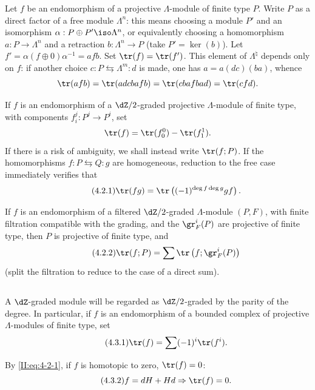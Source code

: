 Let $f$ be an endomorphism of a projective $\Lambda$-module of finite type
$P$. Write $P$ as a direct factor of a free module $\Lambda^n$: this means
choosing a module $P'$ and an isomorphism
$\alpha:P\oplus P'\iso \Lambda^n$, or equivalently choosing a homomorphism
$a:P\to \Lambda^n$ and a retraction $b:\Lambda^n\to P$ (take
$P'=\ker(b)$). Let $f'=\alpha(f\oplus 0)\alpha^{-1} =af b$. Set
$\tr(f) = \tr(f')$. This element of $\Lambda^\natural$ depends only on $f$:
if another choice $c:P\leftrightarrows \Lambda^m:d$ is made, one has
$a=a(dc)(ba)$, whence
\[
 \tr(a f b) = \tr(adcbafb) = \tr(cbafbad) = \tr(cfd) \text{.}
\]

If $f$ is an endomorphism of a $\dZ/2$-graded projective
$\Lambda$-module of finite type, with components $f_i^j:P^j\to P^i$, set
\[
  \tr(f) = \tr(f_0^0) - \tr(f_1^1) \text{.}
\]
If there is a risk of ambiguity, we shall instead write $\tr(f;P)$. If the
homomorphisms $f:P\leftrightarrows Q:g$ are homogeneous, reduction to the
free case immediately verifies that
\begin{equation*}\tag{4.2.1}\label{II:eq:4-2-1}
  \tr(f g) = \tr\left((-1)^{\deg f \deg g} g f\right) \text{.}
\end{equation*}

If $f$ is an endomorphism of a filtered $\dZ/2$-graded $\Lambda$-module
$(P,F)$, with finite filtration compatible with the grading, and the
$\gr_F^i(P)$ are projective of finite type, then $P$ is projective of finite
type, and
\begin{equation*}\tag{4.2.2}\label{II:eq:4-2-2}
  \tr(f;P) = \sum \tr\left(f; \gr_F^i(P) \right)
\end{equation*}
(split the filtration to reduce to the case of a direct sum).






\subsection{}\label{II:4-3}

A $\dZ$-graded module will be regarded as $\dZ/2$-graded by the parity of
the degree. In particular, if $f$ is an endomorphism of a bounded complex of
projective $\Lambda$-modules of finite type, set
\begin{equation*}\tag{4.3.1}\label{II:eq:4-3-1}
  \tr(f) = \sum (-1)^i \tr(f^i) \text{.}
\end{equation*}

By \eqref{II:eq:4-2-1}, if $f$ is homotopic to zero, $\tr(f) = 0$:
\begin{equation*}\tag{4.3.2}\label{II:eq:4-3-2}
  f = d H + H d \Rightarrow \tr(f) = 0 \text{.}
\end{equation*}

